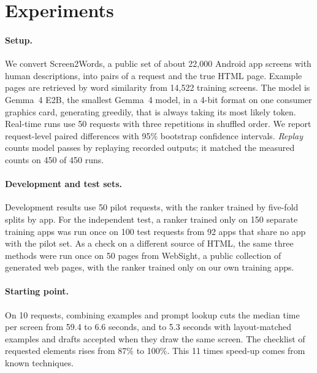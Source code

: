 \documentclass[10pt,a4paper]{article}
\begin{document}
\section{Experiments}
\paragraph{Setup.} We convert Screen2Words, a public set of about 22{,}000 Android app screens with human descriptions, into pairs of a request and the true HTML page. Example pages are retrieved by word similarity from 14{,}522 training screens. The model is Gemma~4 E2B, the smallest Gemma~4 model, in a 4-bit format on one consumer graphics card, generating greedily, that is always taking its most likely token. Real-time runs use 50 requests with three repetitions in shuffled order. We report request-level paired differences with 95\% bootstrap confidence intervals. \emph{Replay} counts model passes by replaying recorded outputs; it matched the measured counts on 450 of 450 runs.

\paragraph{Development and test sets.} Development results use 50 pilot requests, with the ranker trained by five-fold splits by app. For the independent test, a ranker trained only on 150 separate training apps was run once on 100 test requests from 92 apps that share no app with the pilot set. As a check on a different source of HTML, the same three methods were run once on 50 pages from WebSight, a public collection of generated web pages, with the ranker trained only on our own training apps.

\paragraph{Starting point.} On 10 requests, combining examples and prompt lookup cuts the median time per screen from 59.4 to 6.6 seconds, and to 5.3 seconds with layout-matched examples and drafts accepted when they draw the same screen. The checklist of requested elements rises from 87\% to 100\%. This 11 times speed-up comes from known techniques.
\end{document}
